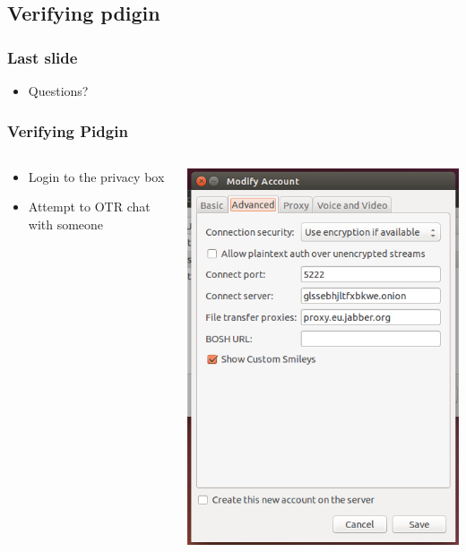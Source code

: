 \documentclass{beamer}
\begin{document}
\subsection{Verifying pdigin}
\begin{frame}

\frametitle{Last slide}
\begin{itemize}
\item Questions?
\end{itemize}

\frametitle{Verifying Pidgin}
\begin{columns}
    \begin{column}{0.48\textwidth}
        \begin{itemize}
          \item Login to the privacy box
          \item Attempt to OTR chat with someone
        \end{itemize}
    \end{column}
    \begin{column}{.5\textwidth}
        \includegraphics[width=.9\linewidth]{pidgin_advanced}
    \end{column}
\end{columns}
\end{frame}
\end{document}
